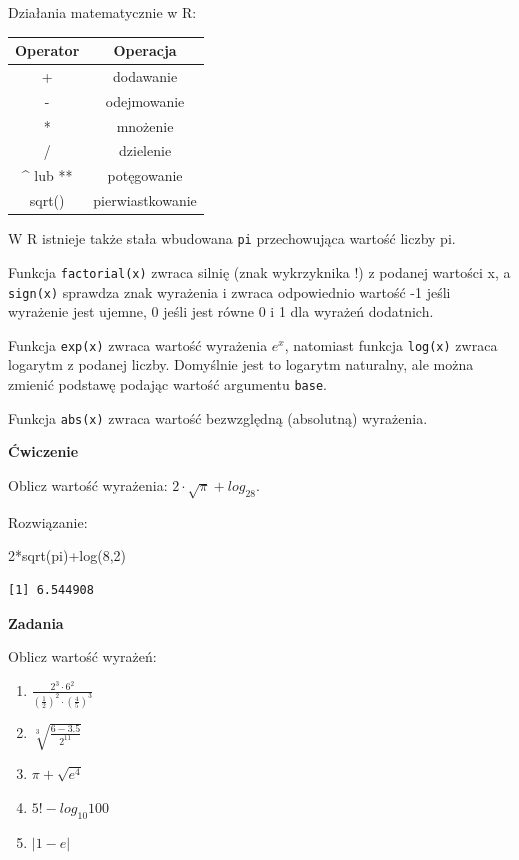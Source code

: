 \documentclass[
  letterpaper,
  DIV=11,
  numbers=noendperiod]{scrreprt}
\newenvironment{Shaded}{\begin{snugshade}}{\end{snugshade}}
\newcommand{\DecValTok}[1]{\textcolor[rgb]{0.68,0.00,0.00}{#1}}
\newcommand{\FunctionTok}[1]{\textcolor[rgb]{0.28,0.35,0.67}{#1}}
\newcommand{\NormalTok}[1]{\textcolor[rgb]{0.00,0.23,0.31}{#1}}
\newcommand{\SpecialCharTok}[1]{\textcolor[rgb]{0.37,0.37,0.37}{#1}}
\providecommand{\tightlist}{%
  \setlength{\itemsep}{0pt}\setlength{\parskip}{0pt}}\usepackage{longtable,booktabs,array}
\begin{document}
Działania matematycznie w R:

\begin{longtable}[]{@{}cc@{}}
\toprule()
Operator & Operacja \\
\midrule()
\endhead
+ & dodawanie \\
- & odejmowanie \\
* & mnożenie \\
/ & dzielenie \\
\^{} lub ** & potęgowanie \\
sqrt() & pierwiastkowanie \\
\bottomrule()
\end{longtable}

W R istnieje także stała wbudowana \texttt{pi} przechowująca wartość
liczby pi.

Funkcja \texttt{factorial(x)} zwraca silnię (znak wykrzyknika !) z
podanej wartości x, a \texttt{sign(x)} sprawdza znak wyrażenia i zwraca
odpowiednio wartość -1 jeśli wyrażenie jest ujemne, 0 jeśli jest równe 0
i 1 dla wyrażeń dodatnich.

Funkcja \texttt{exp(x)} zwraca wartość wyrażenia \(e^x\), natomiast
funkcja \texttt{log(x)} zwraca logarytm z podanej liczby. Domyślnie jest
to logarytm naturalny, ale można zmienić podstawę podając wartość
argumentu \texttt{base}.

Funkcja \texttt{abs(x)} zwraca wartość bezwzględną (absolutną)
wyrażenia.

\textbf{Ćwiczenie}

Oblicz wartość wyrażenia: \(2\cdot \sqrt{\pi} + log_28\).

Rozwiązanie:

\begin{Shaded}
\begin{Highlighting}[]
\DecValTok{2}\SpecialCharTok{*}\FunctionTok{sqrt}\NormalTok{(pi)}\SpecialCharTok{+}\FunctionTok{log}\NormalTok{(}\DecValTok{8}\NormalTok{,}\DecValTok{2}\NormalTok{)}
\end{Highlighting}
\end{Shaded}

\begin{verbatim}
[1] 6.544908
\end{verbatim}

\textbf{Zadania}

Oblicz wartość wyrażeń:

\begin{enumerate}
\def\labelenumi{\arabic{enumi}.}
\tightlist
\item
  \(\frac{2^3\cdot6^2}{(\frac{1}{2})^2\cdot(\frac{4}{5})^3}\)
\item
  \(\sqrt[3]{\frac{6-3.5}{2^{11}}}\)
\item
  \(\pi+\sqrt{e^4}\)
\item
  \(5! - log_{10}100\)
\item
  \(|1-e|\)
\end{enumerate}
\end{document}
